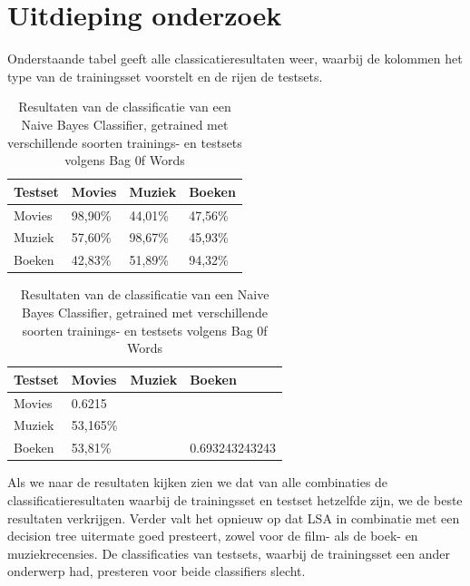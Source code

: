 \section{Uitdieping onderzoek}\label{Deel 2}

Onderstaande tabel geeft alle classicatieresultaten weer, waarbij de kolommen het type van de trainingsset voorstelt en de rijen de testsets.

\begin{table}[h]
\centering
\setlength\tabcolsep{4pt}
\begin{minipage}{0.48\textwidth}
\centering
\begin{tabular}{|l|l|l|l|}
\hline
Testset & Movies  & Muziek  & Boeken  \\  \hline
Movies  & 98,90\% & 44,01\% & 47,56\% \\  \hline
Muziek  & 57,60\% & 98,67\% & 45,93\% \\ \hline
Boeken  & 42,83\% & 51,89\% & 94,32\% \\ \hline
\end{tabular}
\caption{Resultaten van de classificatie met een Decision Tree, getrained op LSA features met verschillende soorten trainings- en testsets}
\label{tab:accuracy}
\end{minipage}%
\hfill
\begin{minipage}{0.48\textwidth}
\centering
\begin{tabular}{|l|l|l|l|}
\hline
Testset & Movies   & Muziek & Boeken         \\ \hline
Movies  & 0.6215   &        &                \\ \hline
Muziek  & 53,165\% &        &                \\ \hline
Boeken  & 53,81\%  &        & 0.693243243243 \\ \hline
\end{tabular}
 \caption{Resultaten van de classificatie van een Naive Bayes Classifier, getrained met verschillende soorten trainings- en testsets volgens Bag 0f Words} 
 \label{tab:ompdiff} 
\end{minipage}
\end{table}

Als we naar de resultaten kijken zien we dat van alle combinaties de classificatieresultaten waarbij de trainingsset en testset hetzelfde zijn, we de beste resultaten verkrijgen.
Verder valt het opnieuw op dat LSA in combinatie met een decision tree uitermate goed presteert, zowel voor de film- als de boek- en muziekrecensies.
De classificaties van testsets, waarbij de trainingsset een ander onderwerp had, presteren voor beide classifiers slecht.


